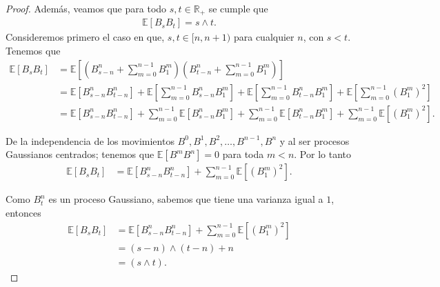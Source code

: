 \begin{proof}
Además, veamos que para todo $s, t \in \mathbb{R}_{+}$ se cumple que
\begin{align*}
\mathbb{E}[B_s B_t] = s \wedge t.
\end{align*}
Consideremos primero el caso en que, $s, t \in [n, n+1)$ para cualquier $n$, con $s < t$. Tenemos que
\begin{align*}
\mathbb{E}[B_s B_t] & = \mathbb{E} \left[ \left( B_{s-n}^n + \sum_{m=0}^{n-1} B_1^m \right) \left( B_{t-n}^n + \sum_{m=0}^{n-1} B_1^m \right) \right] \\
& = \mathbb{E}[B_{s-n}^n B_{t-n}^n] + \mathbb{E} \left[ \sum_{m=0}^{n-1} B_{s-n}^n B_1^m \right] + \mathbb{E} \left[ \sum_{m=0}^{n-1} B_{t-n}^n B_1^m \right] + \mathbb{E} \left[ \sum_{m=0}^{n-1} \left( B_1^m \right)^2 \right] \\
& = \mathbb{E}[B_{s-n}^n B_{t-n}^n] + \sum_{m=0}^{n-1} \mathbb{E} \left[ B_{s-n}^n B_1^m \right] + \sum_{m=0}^{n-1} \mathbb{E} \left[ B_{t-n}^n B_1^m \right] + \sum_{m=0}^{n-1} \mathbb{E} \left[ \left( B_1^m \right)^2 \right].
\end{align*}

De la independencia de los movimientos $B^0, B^1, B^2, \ldots, B^{n-1}, B^n$ y al ser procesos Gaussianos centrados; tenemos que $\mathbb{E}[B^m B^n] = 0$ para toda $m < n$. Por lo tanto
\begin{align*}
\mathbb{E}[B_s B_t] & = \mathbb{E}[B_{s-n}^n B_{t-n}^n] + \sum_{m=0}^{n-1} \mathbb{E} \left[ \left( B_1^m \right)^2 \right].
\end{align*}

Como $B^n_t$ es un proceso Gaussiano, sabemos que tiene una varianza igual a $1$, entonces
\begin{align*}
\mathbb{E}[B_s B_t] & = \mathbb{E}[B_{s-n}^n B_{t-n}^n] + \sum_{m=0}^{n-1} \mathbb{E} \left[ \left( B_1^m \right)^2 \right] \\
& = (s - n) \wedge (t - n) + n \\ 
& = (s \wedge t).
\end{align*}


\end{proof}
